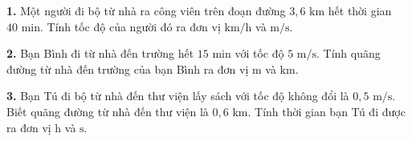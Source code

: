 \documentclass[13pt,a4paper]{article}
\begin{document}
\textbf{1.} Một người đi bộ từ nhà ra công viên trên đoạn đường $3{,}6\text{ km}$ hết thời gian $40\text{ min}$. Tính tốc độ của người đó ra đơn vị $\text{km/h}$ và $\text{m/s}$.
\par\vspace{1pt}\noindent\dotfill\par\vspace{4pt}\noindent\dotfill\par\vspace{4pt}\noindent\dotfill\par\vspace{4pt}\noindent\dotfill\par\vspace{4pt}\noindent\dotfill\par\vspace{4pt}\noindent\dotfill\par\vspace{4pt}\noindent
\textbf{2.} Bạn Bình đi từ nhà đến trường hết $15\text{ min}$ với tốc độ $5\text{ m/s}$. Tính quãng đường từ nhà đến trường của bạn Bình ra đơn vị $\text{m}$ và $\text{km}$.
\par\vspace{1pt}\noindent\dotfill\par\vspace{4pt}\noindent\dotfill\par\vspace{4pt}\noindent\dotfill\par\vspace{4pt}\noindent\dotfill\par\vspace{4pt}\noindent\dotfill\par\vspace{4pt}\noindent\dotfill\par\vspace{4pt}\noindent
\textbf{3.} Bạn Tú đi bộ từ nhà đến thư viện lấy sách với tốc độ không đổi là $0{,}5\text{ m/s}$. Biết quãng đường từ nhà đến thư viện là $0{,}6\text{ km}$. Tính thời gian bạn Tú đi được ra đơn vị $\text{h}$ và $\text{s}$.
\par\vspace{1pt}\noindent\dotfill\par\vspace{4pt}\noindent\dotfill\par\vspace{4pt}\noindent\dotfill\par\vspace{4pt}\noindent\dotfill\par\vspace{4pt}\noindent\dotfill\par\vspace{4pt}\noindent\dotfill\par\vspace{4pt}\noindent
\end{document}
